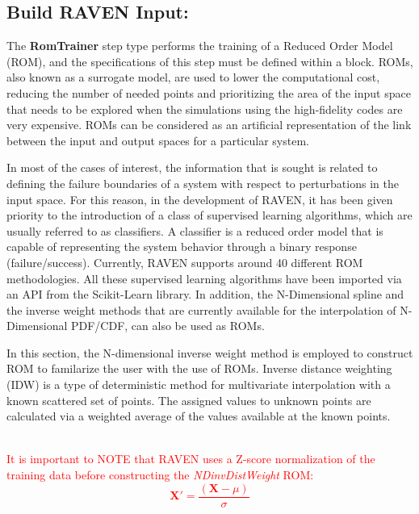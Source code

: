 \newcommand{\zNormalizationPerformed}[1]
{
  \textcolor{red}{\\It is important to NOTE that RAVEN uses a Z-score normalization of the training data before
  constructing the \textit{#1} ROM:
\begin{equation}
  \mathit{\mathbf{X'}} = \frac{(\mathit{\mathbf{X}}-\mu )}{\sigma }
\end{equation}
 }
}

\subsection{Build RAVEN Input: }
\label{sub:ravenROM}
The \textbf{RomTrainer} step type performs the training of a Reduced Order Model (ROM), and the specifications of
this step must be defined within a  block. ROMs, also known as a surrogate model,  are used
to lower the computational cost, reducing the number of needed points and prioritizing the area of the input space
that needs to be explored when the simulations using the high-fidelity codes are very expensive. ROMs can be
considered as an artificial representation of the link between the input and output spaces for a particular system.

In most of the cases of interest, the information that is sought is related to defining the failure boundaries of
a system with respect to perturbations in the input space. For this reason, in the development of RAVEN, it has been
given priority to the introduction of a class of supervised learning algorithms, which are usually referred to as
classifiers. A classifier is a reduced order model that is capable of representing the system behavior through a
binary response (failure/success). Currently, RAVEN supports around 40 different ROM methodologies. All these
supervised learning algorithms have been imported via an API from the Scikit-Learn library. In addition, the N-Dimensional
spline and the inverse weight methods that are currently available for the interpolation of N-Dimensional PDF/CDF,
can also be used as ROMs.

In this section, the N-dimensional inverse weight method is employed to construct ROM to familarize the user with
the use of ROMs. Inverse distance weighting (IDW) is a type of deterministic method for multivariate interpolation
with a known scattered set of points. The assigned values to unknown points are calculated via a weighted average
of the values available at the known points.
\zNormalizationPerformed{NDinvDistWeight}
